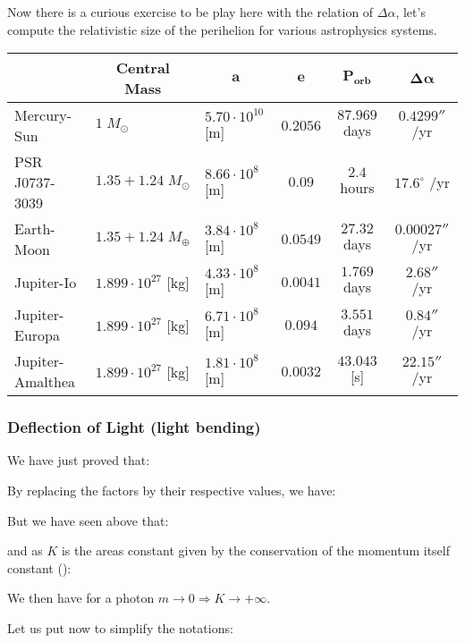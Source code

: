 	Now there is a curious exercise to be play here with the relation of $\Delta \alpha$, let's compute the relativistic size of the perihelion for various astrophysics systems.
	\begin{table}[H]
		\centering
		\begin{tabular}{|l|l|l|c|c|c|}
		\hline
		\rowcolor[HTML]{9B9B9B} 
		\multicolumn{1}{|c|}{\cellcolor[HTML]{9B9B9B}\textbf{System}} & \multicolumn{1}{c|}{\cellcolor[HTML]{9B9B9B}\textbf{Central Mass}} & \multicolumn{1}{c|}{\cellcolor[HTML]{9B9B9B}\textbf{$\pmb{a}$}} & \textbf{$\pmb{e}$} & \textbf{$\pmb{P_\text{orb}}$} & \textbf{$\pmb{\Delta \alpha}$} \\ \hline
		Mercury-Sun & $1\; M_{\odot}$ & $5.70\cdot 10^{10}$ [m] & $0.2056$ & $87.969$ days & $0.4299''$ /yr \\ \hline
		PSR J0737-3039 & $1.35+1.24\; M_{\odot}$ & $8.66\cdot 10^8$ [m] & $0.09$ & $2.4$ hours & $17.6^\circ$ /yr \\ \hline
		Earth-Moon & $1.35+1.24\; M_{\oplus}$ & $3.84\cdot 10^8$ [m] & $0.0549$ & $27.32$ days & $0.00027''$ /yr \\ \hline
		Jupiter-Io & $1.899 \cdot 10^{27}$ [kg] & $4.33\cdot 10^8$ [m] & $0.0041$ & $1.769$ days & $2.68''$ /yr \\ \hline
		Jupiter-Europa & $1.899 \cdot 10^{27}$ [kg] & $6.71\cdot 10^8$  [m] & $0.094$ & $3.551$ days & $0.84''$ /yr \\ \hline
		Jupiter-Amalthea & $1.899 \cdot 10^{27}$ [kg] & $1.81\cdot 10^8$  [m] & $0.0032$ & $43.043$ [s] & $22.15''$ /yr \\ \hline
		\end{tabular}
	\end{table}
	
	\subsubsection{Deflection of Light (light bending)}
	We have just proved that:
	
	By replacing the factors by their respective values, we have:
	
	But we have seen above that:
	
	and as $K$ is the areas constant given by the conservation of the momentum itself constant ():
	
	We then have for a photon $m\rightarrow 0\Rightarrow K\rightarrow +\infty$.
	
	Let us put now to simplify the notations:
	
